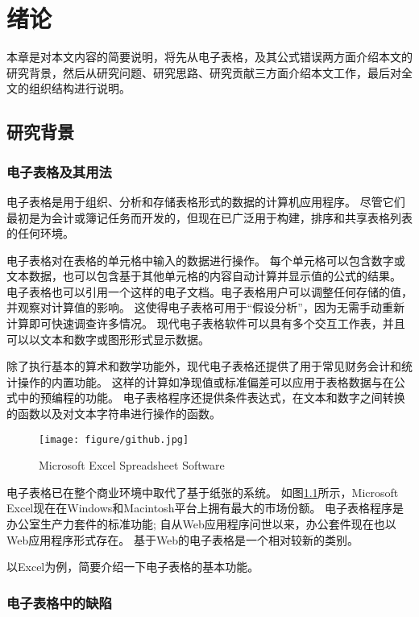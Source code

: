 \chapter{绪论}\label{introduction}

本章是对本文内容的简要说明，将先从电子表格，及其公式错误两方面介绍本文的研究背景，然后从研究问题、研究思路、研究贡献三方面介绍本文工作，最后对全文的组织结构进行说明。

\section{研究背景}

\subsection{电子表格及其用法}

电子表格\cite{BHR12}是用于组织、分析和存储表格形式的数据的计算机应用程序。
尽管它们最初是为会计或簿记任务而开发的，但现在已广泛用于构建，排序和共享表格列表的任何环境。

电子表格对在表格的单元格中输入的数据进行操作。
每个单元格可以包含数字或文本数据，也可以包含基于其他单元格的内容自动计算并显示值的公式的结果。
电子表格也可以引用一个这样的电子文档。电子表格用户可以调整任何存储的值，并观察对计算值的影响。
这使得电子表格可用于“假设分析”，因为无需手动重新计算即可快速调查许多情况。
现代电子表格软件可以具有多个交互工作表，并且可以以文本和数字或图形形式显示数据。

除了执行基本的算术和数学功能外，现代电子表格还提供了用于常见财务会计和统计操作的内置功能。
这样的计算如净现值或标准偏差可以应用于表格数据与在公式中的预编程的功能。
电子表格程序还提供条件表达式，在文本和数字之间转换的函数以及对文本字符串进行操作的函数。

\begin{figure}[t!]
    \centering
    \texttt{[image: figure/github.jpg]}
    \caption{Microsoft Excel Spreadsheet Software}   
    \label{fig:1} 
\end{figure}

电子表格已在整个商业环境中取代了基于纸张的系统。
如图\ref{fig:1}所示，Microsoft Excel现在在Windows和Macintosh平台上拥有最大的市场份额。
电子表格程序是办公室生产力套件的标准功能; 自从Web应用程序问世以来，办公套件现在也以Web应用程序形式存在。
基于Web的电子表格是一个相对较新的类别。

以Excel为例，简要介绍一下电子表格的基本功能。

\subsection{电子表格中的缺陷}

